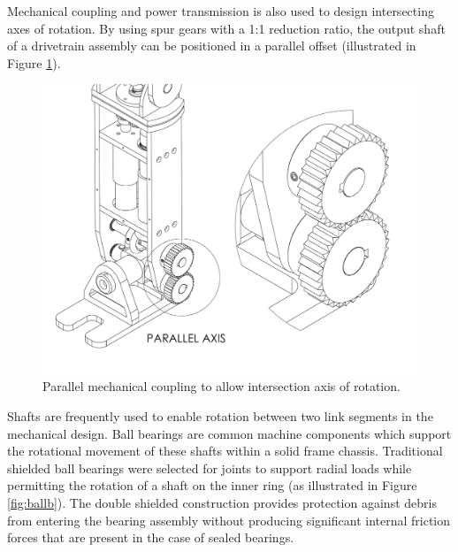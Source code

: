 Mechanical coupling and power transmission is also used to design  intersecting axes of rotation. By using spur gears with a 1:1 reduction ratio, the output shaft of a drivetrain assembly can be positioned in a parallel offset (illustrated in Figure \ref{fig:spur}).

\begin{figure}[!h]	
	\begin{center}
    \includegraphics[scale=0.5]{fig/design/parallel.pdf}
	\end{center}
  \caption{Parallel mechanical coupling to allow intersection axis of rotation.}
\label{fig:spur}
\end{figure}

Shafts are frequently used to enable rotation between two link segments in the mechanical design. Ball bearings are common machine components which support the rotational movement of these shafts within a solid frame chassis. Traditional shielded ball bearings were selected for joints to support radial loads while permitting the rotation of a shaft on the inner ring (as illustrated in Figure \ref{fig:ballb}). The double shielded construction provides protection against debris from entering the bearing assembly without producing significant internal friction forces that are present in the case of sealed bearings. 

